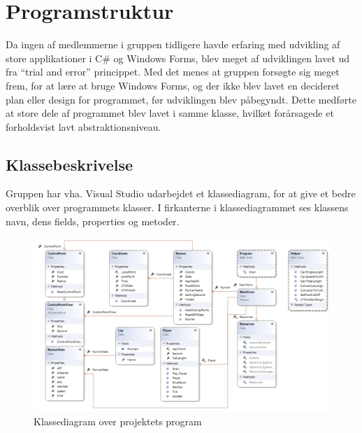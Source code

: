 \section{Programstruktur}
Da ingen af medlemmerne i gruppen tidligere havde erfaring med udvikling af store applikationer i C\# og Windows Forms, blev meget af udviklingen lavet ud fra “trial and error” princippet. Med det menes at gruppen forsøgte sig meget frem, for at lære at bruge Windows Forms, og der ikke blev lavet en decideret plan eller design for programmet, før udviklingen blev påbegyndt. Dette medførte at store dele af programmet blev lavet i samme klasse, hvilket forårsagede et forholdsvist lavt abstraktionsniveau. 

\subsection{Klassebeskrivelse}
Gruppen har vha. Visual Studio udarbejdet et klassediagram, for at give et bedre overblik over programmets klasser. I firkanterne i klassediagrammet ses klassens navn, dens fields, properties og metoder.

\begin{figure} [h]
	\centering
	\includegraphics[width=1\textwidth]{billeder/KlasseDiagram}
	\caption{Klassediagram over projektets program}
\end{figure}

